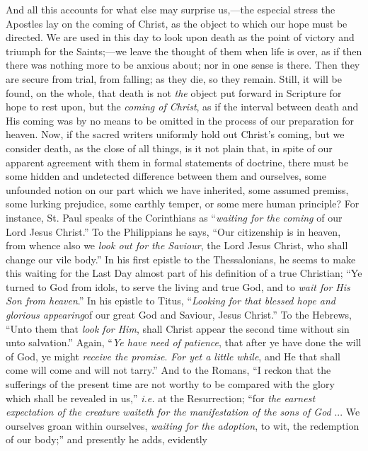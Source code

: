 And all this accounts for what else may surprise us,—the especial
stress the Apostles lay on the coming of Christ, as the object to
which our hope must be directed. We are used in this day to look upon
death as the point of victory and triumph for the Saints;—we leave
the thought of them when life is over, as if then there was nothing
more to be anxious about; nor in one sense is there. Then they are
secure from trial, from falling; as they die, so they remain. Still,
it will be found, on the whole, that death is not \emph{the} object
put forward in Scripture for hope to rest upon, but the \emph{coming of
Christ}, as if the interval between death and His coming was by no
means to be omitted in the process of our preparation for heaven. Now,
if the sacred writers uniformly hold out Christ's coming, but we
consider death, as the close of all things, is it not plain that, in
spite of our apparent agreement with them in formal statements of
doctrine, there must be some hidden and undetected difference between
them and ourselves, some unfounded notion on our part which we have
inherited, some assumed premiss, some lurking prejudice, some earthly
temper, or some mere human principle? For instance, St. Paul speaks of
the Corinthians as ``\emph{waiting for the coming} of our Lord
Jesus Christ.'' To the Philippians he says, ``Our citizenship
is in heaven, from whence also we \emph{look out for the Saviour}, the
Lord Jesus Christ, who shall change our vile body.'' In his first
epistle to the Thessalonians, he seems to make this waiting for the
Last Day almost part of his definition of a true Christian; ``Ye
turned to God from idols, to serve the living and true God, and to \emph{wait
for His Son from heaven}.'' In his epistle to Titus, ``\emph{Looking
for that blessed hope and glorious appearing}of our great God and
Saviour, Jesus Christ.'' To the Hebrews, ``Unto them that \emph{look
for Him}, shall Christ appear the second time without sin unto
salvation.'' Again, ``\emph{Ye have need of patience}, that
after ye have done the will of God, ye might \emph{receive the promise}.
\emph{For yet a little while}, and He that shall come will come and
will not tarry.'' And to the Romans, ``I reckon that the
sufferings of the present time are not worthy to be compared with the
glory which shall be revealed in us,'' \emph{i.e.} at the
Resurrection; ``for \emph{the earnest expectation of the creature
waiteth for the manifestation of the sons of God} ... We ourselves
groan within ourselves, \emph{waiting for the adoption}, to wit, the
redemption of our body;'' and presently he adds, evidently
